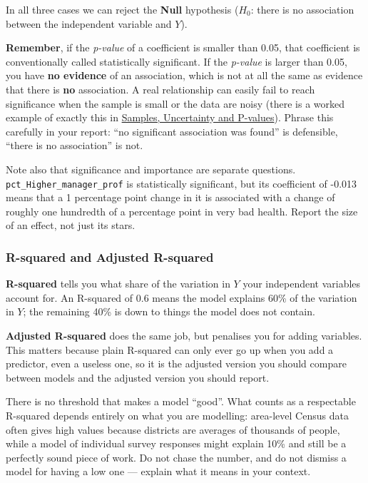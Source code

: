 \documentclass[
  letterpaper,
  DIV=11,
  numbers=noendperiod]{scrreprt}
\begin{document}
In all three cases we can reject the \textbf{Null} hypothesis (\(H_0\):
there is no association between the independent variable and \(Y\)).

\textbf{Remember}, if the \emph{p-value} of a coefficient is smaller
than 0.05, that coefficient is conventionally called statistically
significant. If the \emph{p-value} is larger than 0.05, you have
\textbf{no evidence} of an association, which is not at all the same as
evidence that there is \textbf{no} association. A real relationship can
easily fail to reach significance when the sample is small or the data
are noisy (there is a worked example of exactly this in
\href{https://gdsl-ul.github.io/stats/general/inference.html}{Samples,
Uncertainty and P-values}). Phrase this carefully in your report: ``no
significant association was found'' is defensible, ``there is no
association'' is not.

Note also that significance and importance are separate questions.
\texttt{pct\_Higher\_manager\_prof} is statistically significant, but
its coefficient of -0.013 means that a 1 percentage point change in it
is associated with a change of roughly one hundredth of a percentage
point in very bad health. Report the size of an effect, not just its
stars.

\subsubsection{R-squared and Adjusted
R-squared}\label{r-squared-and-adjusted-r-squared}

\textbf{R-squared} tells you what share of the variation in \(Y\) your
independent variables account for. An R-squared of 0.6 means the model
explains 60\% of the variation in \(Y\); the remaining 40\% is down to
things the model does not contain.

\textbf{Adjusted R-squared} does the same job, but penalises you for
adding variables. This matters because plain R-squared can only ever go
up when you add a predictor, even a useless one, so it is the adjusted
version you should compare between models and the adjusted version you
should report.

There is no threshold that makes a model ``good''. What counts as a
respectable R-squared depends entirely on what you are modelling:
area-level Census data often gives high values because districts are
averages of thousands of people, while a model of individual survey
responses might explain 10\% and still be a perfectly sound piece of
work. Do not chase the number, and do not dismiss a model for having a
low one --- explain what it means in your context.
\end{document}
